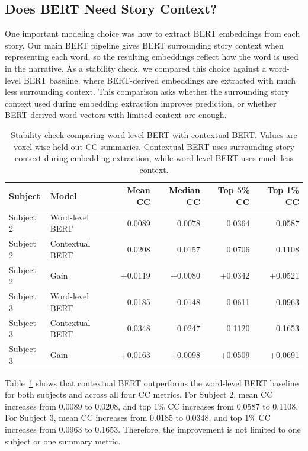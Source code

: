 \documentclass[11pt]{article}
\begin{document}
\subsection{Does BERT Need Story Context?}
\label{sec:stability-context}
One important modeling choice was how to extract BERT embeddings from each story. Our main BERT pipeline gives BERT surrounding story context when representing each word, so the resulting embeddings reflect how the word is used in the narrative. As a stability check, we compared this choice against a word-level BERT baseline, where BERT-derived embeddings are extracted with much less surrounding context. This comparison asks whether the surrounding story context used during embedding extraction improves prediction, or whether BERT-derived word vectors with limited context are enough.

\begin{table}[H]
\centering
\begin{tabular}{llrrrr}
\toprule
Subject & Model & Mean CC & Median CC & Top 5\% CC & Top 1\% CC \\
\midrule
Subject 2 & Word-level BERT & 0.0089 & 0.0078 & 0.0364 & 0.0587 \\
Subject 2 & Contextual BERT & 0.0208 & 0.0157 & 0.0706 & 0.1108 \\
Subject 2 & Gain & +0.0119 & +0.0080 & +0.0342 & +0.0521 \\
\midrule
Subject 3 & Word-level BERT & 0.0185 & 0.0148 & 0.0611 & 0.0963 \\
Subject 3 & Contextual BERT & 0.0348 & 0.0247 & 0.1120 & 0.1653 \\
Subject 3 & Gain & +0.0163 & +0.0098 & +0.0509 & +0.0691 \\
\bottomrule
\end{tabular}
\caption{Stability check comparing word-level BERT with contextual BERT. Values are voxel-wise held-out CC summaries. Contextual BERT uses surrounding story context during embedding extraction, while word-level BERT uses much less context.}
\label{tab:wordlevel-contextual-stability}
\end{table}

Table~\ref{tab:wordlevel-contextual-stability} shows that contextual BERT outperforms the word-level BERT baseline for both subjects and across all four CC metrics. For Subject 2, mean CC increases from 0.0089 to 0.0208, and top 1\% CC increases from 0.0587 to 0.1108. For Subject 3, mean CC increases from 0.0185 to 0.0348, and top 1\% CC increases from 0.0963 to 0.1653. Therefore, the improvement is not limited to one subject or one summary metric.
\end{document}
